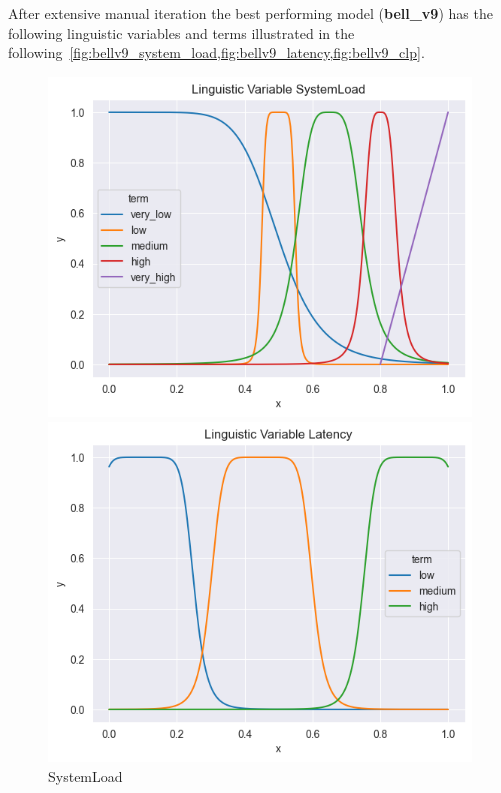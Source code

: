 \documentclass[titlepage]{article}
\begin{document}
\newline
After extensive manual iteration the best performing model (\textbf{bell\_v9}) has the following linguistic variables and terms illustrated in the following~\cref{fig:bellv9_system_load,fig:bellv9_latency,fig:bellv9_clp}.
\begin{figure}[H]
    \centering
    \begin{minipage}{0.32\textwidth}
        \centering
        \includegraphics[width=\textwidth]{../images/bell_v9/SystemLoad}
        \caption{SystemLoad}
        \label{fig:bellv9_system_load}
    \end{minipage}
    \hfill
    \begin{minipage}{0.32\textwidth}
        \centering
        \includegraphics[width=\textwidth]{../images/bell_v9/Latency}

\end{minipage}
\end{figure}
\end{document}
